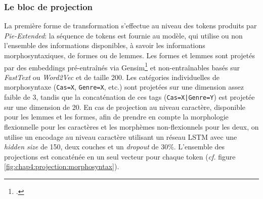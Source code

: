 \subsubsection{Le bloc de projection}

La première forme de transformation s'effectue au niveau des tokens produits par \textit{Pie-Extended}: la séquence de tokens est fournie au modèle, qui utilise ou non l'ensemble des informations disponibles, à savoir les informations morphosyntaxiques, de formes ou de lemmes. Les formes et lemmes sont projetés par des embeddings pré-entraînés via Gensim\footcite{vrehuuvrek2011gensim} et non-entraînables basés sur \textit{FastText} ou \textit{Word2Vec} et de taille 200. Les catégories individuelles de morphosyntaxe (\texttt{Cas=X}, \texttt{Genre=X}, etc.) sont projetées sur une dimension assez faible de 3, tandis que la concaténation de ces tags (\texttt{Cas=X|Genre=Y}) est projetée sur une dimension de 20. En cas de projection au niveau caractère, disponible pour les lemmes et les formes, afin de prendre en compte la morphologie flexionnelle pour les caractères et les morphèmes non-flexionnels pour les deux, on utilise un encodage au niveau caractère utilisant un réseau LSTM avec une \textit{hidden size} de 150, deux couches et un \textit{dropout} de 30\%. L'ensemble des projections est concaténée en un seul vecteur pour chaque token (\textit{cf.} figure \ref{fig:chap4:projection:morphosyntax}).

